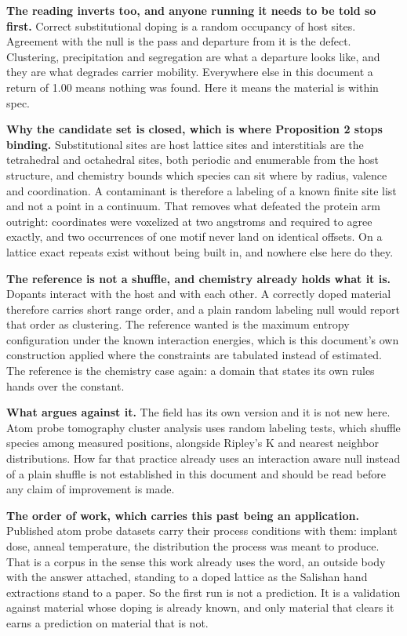 \textbf{The reading inverts too, and anyone running it needs to be told so first.} Correct substitutional doping is a random occupancy of host sites. Agreement with the null is the pass and departure from it is the defect. Clustering, precipitation and segregation are what a departure looks like, and they are what degrades carrier mobility. Everywhere else in this document a return of 1.00 means nothing was found. Here it means the material is within spec.

\textbf{Why the candidate set is closed, which is where Proposition 2 stops binding.} Substitutional sites are host lattice sites and interstitials are the tetrahedral and octahedral sites, both periodic and enumerable from the host structure, and chemistry bounds which species can sit where by radius, valence and coordination. A contaminant is therefore a labeling of a known finite site list and not a point in a continuum. That removes what defeated the protein arm outright: coordinates were voxelized at two angstroms and required to agree exactly, and two occurrences of one motif never land on identical offsets. On a lattice exact repeats exist without being built in, and nowhere else here do they.

\textbf{The reference is not a shuffle, and chemistry already holds what it is.} Dopants interact with the host and with each other. A correctly doped material therefore carries short range order, and a plain random labeling null would report that order as clustering. The reference wanted is the maximum entropy configuration under the known interaction energies, which is this document's own construction applied where the constraints are tabulated instead of estimated. The reference is the chemistry case again: a domain that states its own rules hands over the constant.

\textbf{What argues against it.} The field has its own version and it is not new here. Atom probe tomography cluster analysis uses random labeling tests, which shuffle species among measured positions, alongside Ripley's K and nearest neighbor distributions. How far that practice already uses an interaction aware null instead of a plain shuffle is not established in this document and should be read before any claim of improvement is made.

\textbf{The order of work, which carries this past being an application.} Published atom probe datasets carry their process conditions with them: implant dose, anneal temperature, the distribution the process was meant to produce. That is a corpus in the sense this work already uses the word, an outside body with the answer attached, standing to a doped lattice as the Salishan hand extractions stand to a paper. So the first run is not a prediction. It is a validation against material whose doping is already known, and only material that clears it earns a prediction on material that is not.

